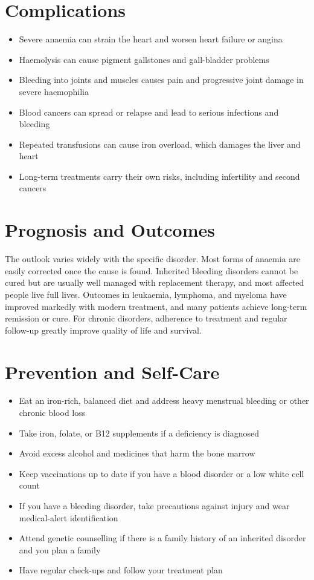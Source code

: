 \section*{Complications}
\begin{itemize}
    \item Severe anaemia can strain the heart and worsen heart failure or angina
    \item Haemolysis can cause pigment gallstones and gall-bladder problems
    \item Bleeding into joints and muscles causes pain and progressive joint damage in severe haemophilia
    \item Blood cancers can spread or relapse and lead to serious infections and bleeding
    \item Repeated transfusions can cause iron overload, which damages the liver and heart
    \item Long-term treatments carry their own risks, including infertility and second cancers
\end{itemize}

\section*{Prognosis and Outcomes}
The outlook varies widely with the specific disorder. Most forms of anaemia are easily corrected once the cause is found. Inherited bleeding disorders cannot be cured but are usually well managed with replacement therapy, and most affected people live full lives. Outcomes in leukaemia, lymphoma, and myeloma have improved markedly with modern treatment, and many patients achieve long-term remission or cure. For chronic disorders, adherence to treatment and regular follow-up greatly improve quality of life and survival.

\section*{Prevention and Self-Care}
\begin{itemize}
    \item Eat an iron-rich, balanced diet and address heavy menstrual bleeding or other chronic blood loss
    \item Take iron, folate, or B12 supplements if a deficiency is diagnosed
    \item Avoid excess alcohol and medicines that harm the bone marrow
    \item Keep vaccinations up to date if you have a blood disorder or a low white cell count
    \item If you have a bleeding disorder, take precautions against injury and wear medical-alert identification
    \item Attend genetic counselling if there is a family history of an inherited disorder and you plan a family
    \item Have regular check-ups and follow your treatment plan
\end{itemize}

